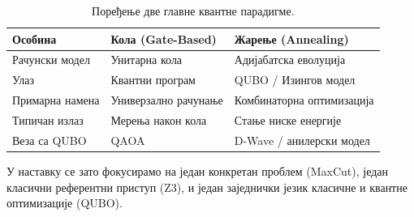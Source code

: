 \begin{table}[ht]
  \centering
  \caption{Поређење две главне квантне парадигме.}
  \label{tab:paradigme}
  \renewcommand{\arraystretch}{1.3}
  \begin{tabular}{lll}
    \toprule
    \textbf{Особина} & \textbf{Кола (Gate-Based)} & \textbf{Жарење (Annealing)} \\
    \midrule
    Рачунски модел   & Унитарна кола              & Адијабатска еволуција \\
    Улаз             & Квантни програм            & QUBO / Изингов модел \\
    Примарна намена  & Универзално рачунање       & Комбинаторна оптимизација \\
    Типичан излаз    & Мерења након кола          & Стање ниске енергије \\
    Веза са QUBO & QAOA                      & D-Wave / анилерски модел \\
    \bottomrule
  \end{tabular}
\end{table}

У наставку се зато фокусирамо на један конкретан проблем (MaxCut),
један класични референтни приступ (Z3), и један заједнички језик
класичне и квантне оптимизације (QUBO).
